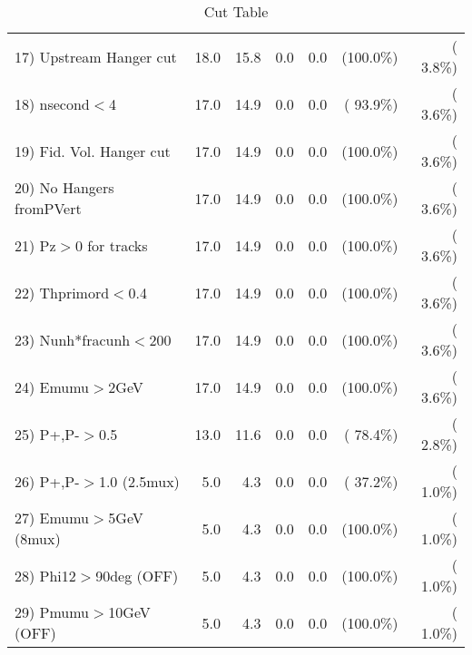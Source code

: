 \begin{table}[h!]
\begin{tabular}{||l||r|r|r|r|r|r||}
 17) Upstream Hanger cut  &         18.0 &         15.8 &          0.0 &          0.0 & (100.0\%) & (  3.8\%) \\
 18) nsecond$<$4          &         17.0 &         14.9 &          0.0 &          0.0 & ( 93.9\%) & (  3.6\%) \\
 19) Fid. Vol. Hanger cut &         17.0 &         14.9 &          0.0 &          0.0 & (100.0\%) & (  3.6\%) \\
 20) No Hangers fromPVert &         17.0 &         14.9 &          0.0 &          0.0 & (100.0\%) & (  3.6\%) \\
 21) Pz$>$0 for tracks    &         17.0 &         14.9 &          0.0 &          0.0 & (100.0\%) & (  3.6\%) \\
 22) Thprimord$<$0.4      &         17.0 &         14.9 &          0.0 &          0.0 & (100.0\%) & (  3.6\%) \\
 23) Nunh*fracunh$<$200   &         17.0 &         14.9 &          0.0 &          0.0 & (100.0\%) & (  3.6\%) \\
 24) Emumu$>$2GeV         &         17.0 &         14.9 &          0.0 &          0.0 & (100.0\%) & (  3.6\%) \\
 25) P+,P-$>$0.5          &         13.0 &         11.6 &          0.0 &          0.0 & ( 78.4\%) & (  2.8\%) \\
 26) P+,P-$>$1.0 (2.5mux) &          5.0 &          4.3 &          0.0 &          0.0 & ( 37.2\%) & (  1.0\%) \\
 27) Emumu$>$5GeV  (8mux) &          5.0 &          4.3 &          0.0 &          0.0 & (100.0\%) & (  1.0\%) \\
 28) Phi12$>$90deg  (OFF) &          5.0 &          4.3 &          0.0 &          0.0 & (100.0\%) & (  1.0\%) \\
 29) Pmumu$>$10GeV  (OFF) &          5.0 &          4.3 &          0.0 &          0.0 & (100.0\%) & (  1.0\%) \\
 \hline
 \hline
 \end{tabular}
 \caption{Cut Table           }
 \label{tab-cutcohjpsi-mumu_jpsi}
 \end{table}
